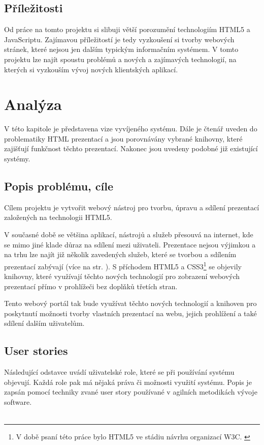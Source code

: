 \documentclass[11pt,twoside,a4paper]{book}
\newcommand*{\nom}[2]{#1 \nomenclature{#1}{#2}} 			%
\begin{document}
\section{Příležitosti}
Od práce na tomto projektu si slibuji větší porozumění technologiím HTML5 a JavaScriptu. Zajímavou příležitostí je tedy vyzkoušení si tvorby webových stránek, které nejsou jen dalším typickým informačním systémem. V tomto projektu lze najít spoustu problémů a nových a zajímavých technologií, na kterých si vyzkouším vývoj nových klientských aplikací.






\chapter{Analýza}
V této kapitole je představena vize vyvíjeného systému. Dále je čtenář uveden do problematiky \nom{HTML}{HyperText Markup Language} prezentací a jsou porovnávány vybrané knihovny, které zajišťují funkčnost těchto prezentací. Nakonec jsou uvedeny podobné již existující systémy.

\section{Popis problému, cíle}
Cílem projektu je vytvořit webový nástroj pro tvorbu, úpravu a sdílení prezentací založených na technologii HTML5.

V současné době se většina aplikací, nástrojů a služeb přesouvá na internet, kde se mimo jiné klade důraz na sdílení mezi uživateli. Prezentace nejsou výjimkou a na trhu lze najít již několik zavedených služeb, které se tvorbou a sdílením prezentací zabývají (více na str. \pageref{chap:existujiciSystemy}). S příchodem HTML5 a CSS3\footnote{V době psaní této práce bylo HTML5 ve stádiu návrhu organizací W3C. \cite{html5-2014}} se objevily knihovny, které využívají těchto nových technologií pro zobrazení webových prezentací přímo v prohlížeči bez doplňků třetích stran.

Tento webový portál tak bude využívat těchto nových technologií a knihoven pro poskytnutí možnosti tvorby vlastních prezentací na webu, jejich prohlížení a také sdílení dalším uživatelům.


\section{User stories}\label{chap:userstory}
Následující odstavce uvádí uživatelské role, které se při používání systému objevují. Každá role pak má nějaká práva či možnosti využití systému. Popis je zapsán pomocí techniky zvané user story používané v agilních metodikách vývoje software. \\\\
\end{document}
